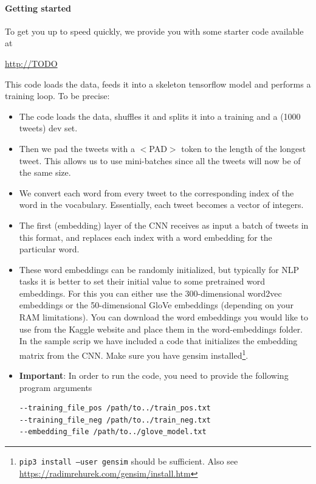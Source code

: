 \documentclass{article}
\begin{document}
\paragraph{Getting started} To get you up to speed quickly, we provide you with some starter code available at
\begin{center}
	\url{http://TODO}
\end{center}
This code loads the data, feeds it into a skeleton tensorflow model and performs a training loop.  To be precise:
\begin{itemize}
\item The code loads the data, shuffles it and splits it into a training and a (1000 tweets) dev set.
\item Then we pad the tweets with a $<$PAD$>$ token to the length of the longest tweet. This allows us to use mini-batches since all the tweets will now be of the same size.
\item We convert each word from every tweet to the corresponding index of the word in the vocabulary. Essentially, each tweet becomes a vector of integers.
\item 
The first (embedding) layer of the CNN receives as input a batch of tweets in this format, and replaces each index with a word embedding for the particular word.
\item These word embeddings can be randomly initialized, but typically for NLP tasks it is better to set their initial value to some pretrained word embeddings. For this you can either use the 300-dimensional word2vec embeddings or the 50-dimensional GloVe embeddings (depending on your RAM limitations). You can download the word embeddings you would like to use from the Kaggle website and place them in the word-embeddings folder. In the sample scrip we have included a code that initializes the embedding matrix from the CNN. Make sure you have gensim installed\footnote{\texttt{pip3 install --user gensim} should be sufficient. Also see \url{https://radimrehurek.com/gensim/install.htm}}.
\item \textbf{Important}: In order to run the code, you need to provide the following program arguments 	
\begin{verbatim}
--training_file_pos /path/to../train_pos.txt
--training_file_neg /path/to../train_neg.txt
--embedding_file /path/to../glove_model.txt
\end{verbatim}
\end{itemize}
\end{document}
